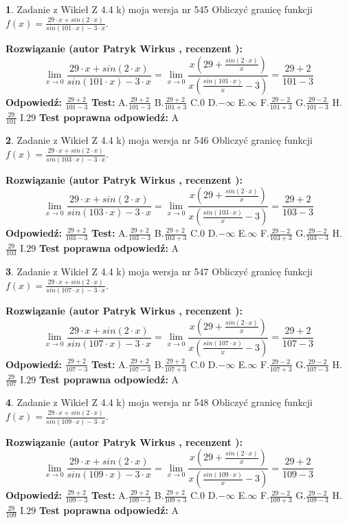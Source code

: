 \documentclass[12pt, a4paper]{article}
\theoremstyle{definition} %
\newtheorem{zad}{}
\newcommand{\zadStart}[1]{\begin{zad}#1\newline}
\newcommand{\zadStop}{\end{zad}}
\newcommand{\rozwStart}[2]{\noindent \textbf{Rozwiązanie (autor #1 , recenzent #2): }\newline}
\newcommand{\rozwStop}{\newline}
\newcommand{\odpStart}{\noindent \textbf{Odpowiedź:}\newline}
\newcommand{\odpStop}{\newline}
\newcommand{\testStart}{\noindent \textbf{Test:}\newline}
\newcommand{\testStop}{\newline}
\newcommand{\kluczStart}{\noindent \textbf{Test poprawna odpowiedź:}\newline}
\newcommand{\kluczStop}{\newline}
\begin{document}
\zadStart{Zadanie z Wikieł Z 4.4 k) moja wersja nr 545}
Obliczyć granicę funkcji $f(x)=\frac{29\cdot x +sin(2\cdot x)}{sin(101\cdot x) -3\cdot x}$.
\zadStop
\rozwStart{Patryk Wirkus}{}
$$\lim\limits_{x\to 0}\frac{29\cdot x +sin(2\cdot x)}{sin(101\cdot x) -3\cdot x}
=\lim\limits_{x\to 0}\frac{x(29+\frac{sin(2\cdot x)}{x})}{x(\frac{sin(101\cdot x)}{x}-3)}
=\frac{29+2}{101-3}$$
\rozwStop
\odpStart
$\frac{29+2}{101-3}$
\odpStop
\testStart
A.$\frac{29+2}{101-3}$
B.$\frac{29+2}{101+3}$
C.$0$
D.$-\infty$
E.$\infty$
F.$\frac{29-2}{101+3}$
G.$\frac{29-2}{101-3}$
H.$\frac{29}{101}$
I.$29$
\testStop
\kluczStart
A
\kluczStop



\zadStart{Zadanie z Wikieł Z 4.4 k) moja wersja nr 546}
Obliczyć granicę funkcji $f(x)=\frac{29\cdot x +sin(2\cdot x)}{sin(103\cdot x) -3\cdot x}$.
\zadStop
\rozwStart{Patryk Wirkus}{}
$$\lim\limits_{x\to 0}\frac{29\cdot x +sin(2\cdot x)}{sin(103\cdot x) -3\cdot x}
=\lim\limits_{x\to 0}\frac{x(29+\frac{sin(2\cdot x)}{x})}{x(\frac{sin(103\cdot x)}{x}-3)}
=\frac{29+2}{103-3}$$
\rozwStop
\odpStart
$\frac{29+2}{103-3}$
\odpStop
\testStart
A.$\frac{29+2}{103-3}$
B.$\frac{29+2}{103+3}$
C.$0$
D.$-\infty$
E.$\infty$
F.$\frac{29-2}{103+3}$
G.$\frac{29-2}{103-3}$
H.$\frac{29}{103}$
I.$29$
\testStop
\kluczStart
A
\kluczStop



\zadStart{Zadanie z Wikieł Z 4.4 k) moja wersja nr 547}
Obliczyć granicę funkcji $f(x)=\frac{29\cdot x +sin(2\cdot x)}{sin(107\cdot x) -3\cdot x}$.
\zadStop
\rozwStart{Patryk Wirkus}{}
$$\lim\limits_{x\to 0}\frac{29\cdot x +sin(2\cdot x)}{sin(107\cdot x) -3\cdot x}
=\lim\limits_{x\to 0}\frac{x(29+\frac{sin(2\cdot x)}{x})}{x(\frac{sin(107\cdot x)}{x}-3)}
=\frac{29+2}{107-3}$$
\rozwStop
\odpStart
$\frac{29+2}{107-3}$
\odpStop
\testStart
A.$\frac{29+2}{107-3}$
B.$\frac{29+2}{107+3}$
C.$0$
D.$-\infty$
E.$\infty$
F.$\frac{29-2}{107+3}$
G.$\frac{29-2}{107-3}$
H.$\frac{29}{107}$
I.$29$
\testStop
\kluczStart
A
\kluczStop



\zadStart{Zadanie z Wikieł Z 4.4 k) moja wersja nr 548}
Obliczyć granicę funkcji $f(x)=\frac{29\cdot x +sin(2\cdot x)}{sin(109\cdot x) -3\cdot x}$.
\zadStop
\rozwStart{Patryk Wirkus}{}
$$\lim\limits_{x\to 0}\frac{29\cdot x +sin(2\cdot x)}{sin(109\cdot x) -3\cdot x}
=\lim\limits_{x\to 0}\frac{x(29+\frac{sin(2\cdot x)}{x})}{x(\frac{sin(109\cdot x)}{x}-3)}
=\frac{29+2}{109-3}$$
\rozwStop
\odpStart
$\frac{29+2}{109-3}$
\odpStop
\testStart
A.$\frac{29+2}{109-3}$
B.$\frac{29+2}{109+3}$
C.$0$
D.$-\infty$
E.$\infty$
F.$\frac{29-2}{109+3}$
G.$\frac{29-2}{109-3}$
H.$\frac{29}{109}$
I.$29$
\testStop
\kluczStart
A
\kluczStop
\end{document}
